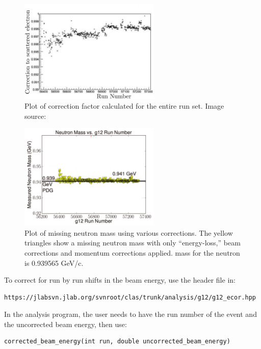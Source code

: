\begin{figure}\begin{center}
\includegraphics[width=0.6\textwidth]{figures/calib/tag/ecor/beam_cor.eps}
\caption[Beam Correction Factors for Entire  Runs]{\label{fig:beamcor.run} Plot of correction factor calculated for the entire  run set. Image source:~\cite{clas.thesis.kunkel}}
\end{center}\end{figure}

\begin{figure}\begin{center}
\includegraphics[width=0.6\textwidth]{figures/calib/tag/ecor/C3pi_allcorr_neutron_rxr.pdf}
\caption[Corrected Missing Neutron Mass for  Using Beam Corrections]{\label{fig:neutron.fixall} Plot of missing neutron mass using various corrections. The yellow triangles show a missing neutron mass with only ``energy-loss,'' beam corrections and momentum corrections applied.  mass for the neutron is 0.939565 GeV/c.}
\end{center}\end{figure}



To correct for run by run shifts in the beam energy, use the header file in:
\begin{verbatim}
https://jlabsvn.jlab.org/svnroot/clas/trunk/analysis/g12/g12_ecor.hpp
\end{verbatim}

In the analysis program, the user needs to have the run number of the event and the uncorrected beam energy, then use:
\begin{verbatim}
corrected_beam_energy(int run, double uncorrected_beam_energy)
\end{verbatim}


\FloatBarrier
